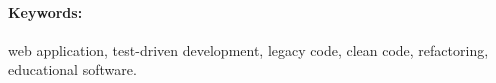\documentclass[12pt, oneside]{book}  %
\begin{document}
\paragraph*{Keywords:} web application, test-driven development, legacy code, clean code, refactoring, educational software.


%
%



\newpage 

\tableofcontents



\newpage 

\listoffigures


\mainmatter


 













\newpage	

\backmatter

\thispagestyle{empty}
\nocite{*}
\clearpage




 
\end{document}
